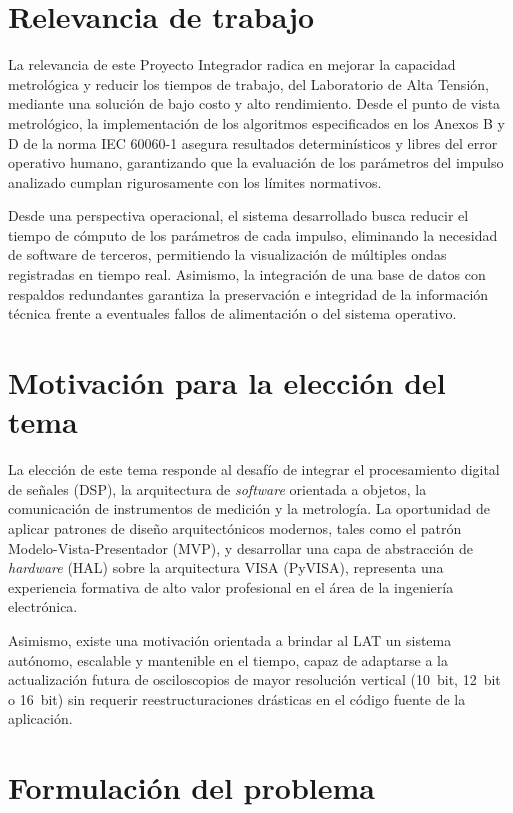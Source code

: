 \section{Relevancia de trabajo}
\label{sec:relevancia}

La relevancia de este Proyecto Integrador radica en mejorar la capacidad metrológica y reducir los tiempos de trabajo, del Laboratorio de Alta Tensión, mediante una solución de bajo costo y alto rendimiento. Desde el punto de vista metrológico, la implementación de los algoritmos especificados en los Anexos B y D de la norma IEC 60060-1 \cite{iec60060_1} asegura resultados determinísticos y libres del error operativo humano, garantizando que la evaluación de los parámetros del impulso analizado cumplan rigurosamente con los límites normativos.

Desde una perspectiva operacional, el sistema desarrollado busca reducir el tiempo de cómputo de los parámetros de cada impulso, eliminando la necesidad de software de terceros, permitiendo la visualización de múltiples ondas registradas en tiempo real. Asimismo, la integración de una base de datos con respaldos redundantes garantiza la preservación e integridad de la información técnica frente a eventuales fallos de alimentación o del sistema operativo.

\section{Motivación para la elección del tema}
\label{sec:motivacion}

La elección de este tema responde al desafío de integrar el procesamiento digital de señales (DSP), la arquitectura de \emph{software} orientada a objetos, la comunicación de instrumentos de medición y la metrología. La oportunidad de aplicar patrones de diseño arquitectónicos modernos, tales como el patrón Modelo-Vista-Presentador (MVP), y desarrollar una capa de abstracción de \emph{hardware} (HAL) sobre la arquitectura VISA (PyVISA), representa una experiencia formativa de alto valor profesional en el área de la ingeniería electrónica.

Asimismo, existe una motivación orientada a brindar al LAT un sistema autónomo, escalable y mantenible en el tiempo, capaz de adaptarse a la actualización futura de osciloscopios de mayor resolución vertical (\qty{10}{bit}, \qty{12}{bit} o \qty{16}{bit}) sin requerir reestructuraciones drásticas en el código fuente de la aplicación.

\section{Formulación del problema}
\label{sec:formulacion_problema}



